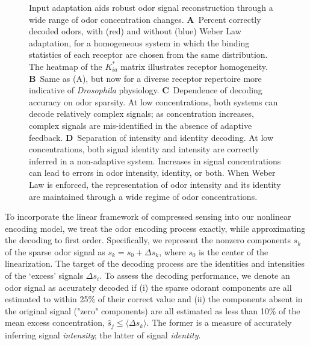 \begin{figure}[!tb]
	\caption{\footnotesize{Input adaptation aids robust odor signal reconstruction through a wide range of odor concentration changes. \textbf{A}~Percent correctly decoded odors, with (red) and without (blue) Weber Law adaptation, for a homogeneous system in which the binding statistics of each receptor are chosen from the same distribution. The heatmap of the $K^*_{ia}$ matrix illustrates receptor homogeneity. \textbf{B}~Same as (A), but now for a diverse receptor repertoire more indicative of \textit{Drosophila} physiology. \textbf{C}~Dependence of decoding accuracy on odor sparsity. At low concentrations, both systems can decode relatively complex signals; as concentration increases, complex signals are mis-identified in the absence of adaptive feedback. \textbf{D}~Separation of intensity and identity decoding. At low concentrations, both signal identity and intensity are correctly inferred in a non-adaptive system. Increases in signal concentrations can lead to errors in odor intensity, identity, or both. When Weber Law is enforced, the representation of odor intensity and its identity are maintained through a wide regime of odor concentrations.}}
	\label{fig:decoding}
\end{figure}

To incorporate the linear framework of compressed sensing into our nonlinear encoding model, we treat the odor encoding process exactly, while approximating the decoding to first order. %
Specifically, we represent the nonzero components $s_k$ of the sparse odor signal as $s_k = s_0 + \Delta s_k$, where $s_0$ is the center of the linearization. The target of the decoding process are the identities and intensities of the `excess' signals $\Delta s_i$. 
To assess the decoding performance, we denote an odor signal as accurately decoded if (i) the sparse odorant components are all estimated to within 25\% of their correct value and (ii) the components absent in the original signal ("zero" components) are all estimated as less than 10\% of the mean excess concentration, $\hat s_j \le \langle \Delta s_k \rangle$. The former is a measure of accurately inferring signal \textit{intensity}; the latter of signal \textit{identity}. 

